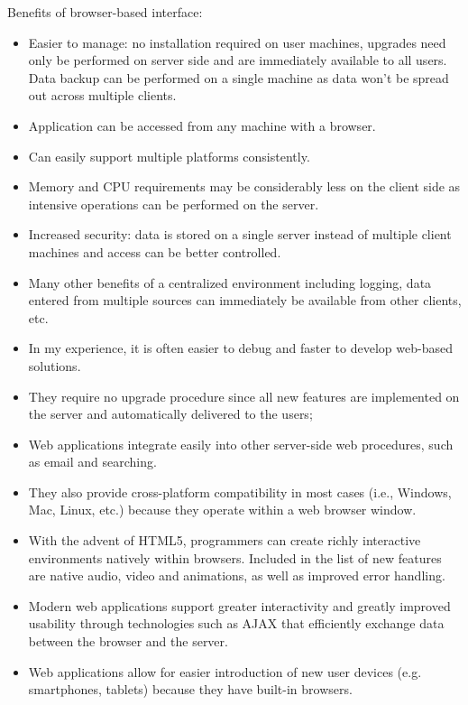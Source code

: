 Benefits of browser-based interface:
\begin{itemize}
\item Easier to manage: no installation required on user machines, upgrades need only be performed on server side and are immediately available to all users. Data backup can be performed on a single machine as data won't be spread out across multiple clients.
\item Application can be accessed from any machine with a browser.
\item Can easily support multiple platforms consistently.
\item Memory and CPU requirements may be considerably less on the client side as intensive operations can be performed on the server.
\item Increased security: data is stored on a single server instead of multiple client machines and access can be better controlled.
\item Many other benefits of a centralized environment including logging, data entered from multiple sources can immediately be available from other clients, etc.
\item In my experience, it is often easier to debug and faster to develop web-based solutions.
\item They require no upgrade procedure since all new features are implemented on the server and automatically delivered to the users;
\item Web applications integrate easily into other server-side web procedures, such as email and searching.
\item They also provide cross-platform compatibility in most cases (i.e., Windows, Mac, Linux, etc.) because they operate within a web browser window.
\item With the advent of HTML5, programmers can create richly interactive environments natively within browsers. Included in the list of new features are native audio, video and animations, as well as improved error handling.
\item Modern web applications support greater interactivity and greatly improved usability through technologies such as AJAX that efficiently exchange data between the browser and the server.
\item Web applications allow for easier introduction of new user devices (e.g. smartphones, tablets) because they have built-in browsers.
\end{itemize}


